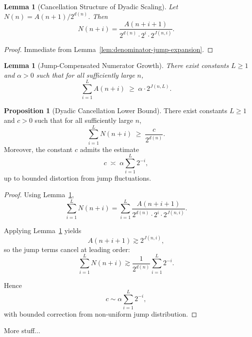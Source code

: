 \documentclass[12pt, oneside]{article}
\numberwithin{equation}{section}
\theoremstyle{definition}
\newtheorem{proposition}{Proposition}[section]
\theoremstyle{plain}
\newtheorem{lemma}[theorem]{Lemma}
\theoremstyle{remark}
\begin{document}
\begin{lemma}[Cancellation Structure of Dyadic Scaling]
\label{lem:dyadic-cancellation}
Let $N(n) = A(n+1)/2^{d(n)}$. Then
\[
N(n+i)
=
\frac{A(n+i+1)}{2^{d(n)} \cdot 2^{i} \cdot 2^{J(n,i)}}.
\]
\end{lemma}

\begin{proof}
Immediate from Lemma~\ref{lem:denominator-jump-expansion}.
\end{proof}


\begin{lemma}[Jump-Compensated Numerator Growth]
\label{lem:jump-comp-growth}
There exist constants $L \ge 1$ and $\alpha > 0$ such that
for all sufficiently large $n$,
\[
\sum_{i=1}^{L} A(n+i)
\;\ge\;
\alpha \cdot 2^{J(n,L)}.
\]
\end{lemma}


\begin{proposition}[Dyadic Cancellation Lower Bound]
\label{prop:dyadic-cancellation-bound}
There exist constants $L \ge 1$ and $c > 0$ such that
for all sufficiently large $n$,
\[
\sum_{i=1}^{L} N(n+i)
\;\ge\;
\frac{c}{2^{d(n)}}.
\]
Moreover, the constant $c$ admits the estimate
\[
c
\;\asymp\;
\alpha \sum_{i=1}^{L} 2^{-i},
\]
up to bounded distortion from jump fluctuations.
\end{proposition}

\begin{proof}
Using Lemma~\ref{lem:dyadic-cancellation},
\[
\sum_{i=1}^{L} N(n+i)
=
\sum_{i=1}^{L}
\frac{A(n+i+1)}{2^{d(n)} \cdot 2^{i} \cdot 2^{J(n,i)}}.
\]

Applying Lemma~\ref{lem:jump-comp-growth} yields
\[
A(n+i+1) \gtrsim 2^{J(n,i)},
\]
so the jump terms cancel at leading order:
\[
\sum_{i=1}^{L} N(n+i)
\gtrsim
\frac{1}{2^{d(n)}} \sum_{i=1}^{L} 2^{-i}.
\]

Hence
\[
c \sim \alpha \sum_{i=1}^{L} 2^{-i},
\]
with bounded correction from non-uniform jump distribution.
\end{proof}


More stuff...
\end{document}
